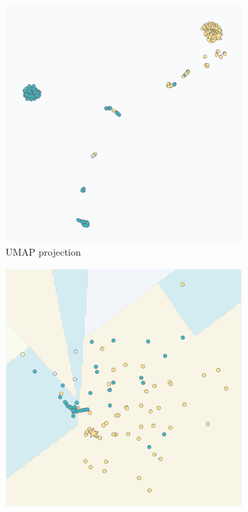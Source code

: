 \begin{figure}[ht]
\centering
\begin{subfigure}[c]{0.48\textwidth}
\centering
\includegraphics[width=\textwidth]{images/ds_scatter_umap_500.png}
\caption{UMAP projection}
\label{fig:ds_scatter_umap_500}
\end{subfigure}
\hfill
\begin{subfigure}[c]{0.48\textwidth}
\centering
\includegraphics[width=\textwidth]{images/ds_scatter_pca_500.png}

\end{subfigure}
\end{figure}
